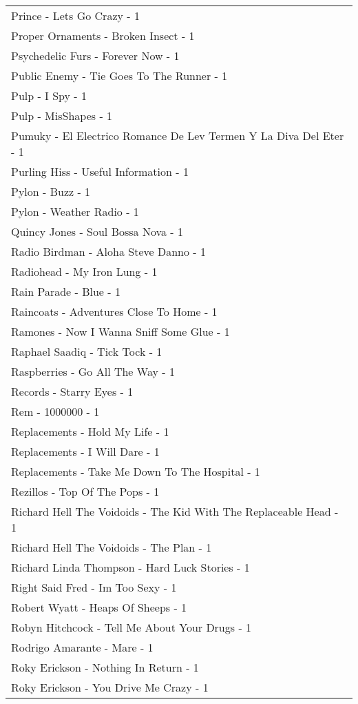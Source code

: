\documentclass[
]{article}
\begin{document}
\begin{longtable}{l}
Prince - Lets Go Crazy - 1 \\ 
Proper Ornaments - Broken Insect - 1 \\ 
Psychedelic Furs - Forever Now - 1 \\ 
Public Enemy - Tie Goes To The Runner - 1 \\ 
Pulp - I Spy - 1 \\ 
Pulp - MisShapes - 1 \\ 
Pumuky - El Electrico Romance De Lev Termen Y La Diva Del Eter - 1 \\ 
Purling Hiss - Useful Information - 1 \\ 
Pylon - Buzz - 1 \\ 
Pylon - Weather Radio - 1 \\ 
Quincy Jones - Soul Bossa Nova - 1 \\ 
Radio Birdman - Aloha Steve Danno - 1 \\ 
Radiohead - My Iron Lung - 1 \\ 
Rain Parade - Blue - 1 \\ 
Raincoats - Adventures Close To Home - 1 \\ 
Ramones - Now I Wanna Sniff Some Glue - 1 \\ 
Raphael Saadiq - Tick Tock - 1 \\ 
Raspberries - Go All The Way - 1 \\ 
Records - Starry Eyes - 1 \\ 
Rem - 1000000 - 1 \\ 
Replacements - Hold My Life - 1 \\ 
Replacements - I Will Dare - 1 \\ 
Replacements - Take Me Down To The Hospital - 1 \\ 
Rezillos - Top Of The Pops - 1 \\ 
Richard Hell The Voidoids - The Kid With The Replaceable Head - 1 \\ 
Richard Hell The Voidoids - The Plan - 1 \\ 
Richard Linda Thompson - Hard Luck Stories - 1 \\ 
Right Said Fred - Im Too Sexy - 1 \\ 
Robert Wyatt - Heaps Of Sheeps - 1 \\ 
Robyn Hitchcock - Tell Me About Your Drugs - 1 \\ 
Rodrigo Amarante - Mare - 1 \\ 
Roky Erickson - Nothing In Return - 1 \\ 
Roky Erickson - You Drive Me Crazy - 1 \\ 

\end{longtable}
\end{document}
